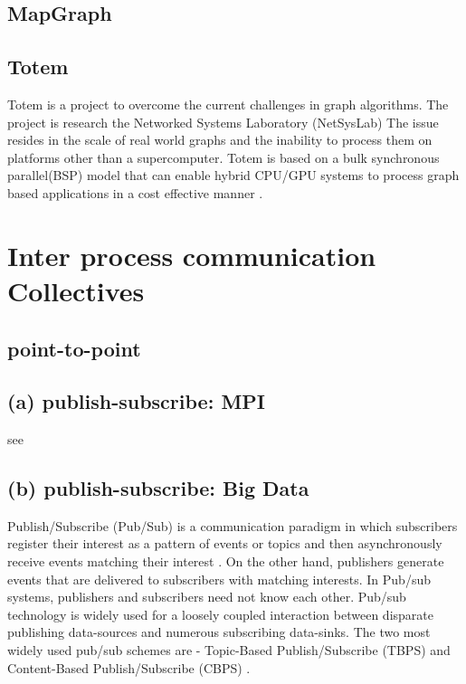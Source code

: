      \pv

\subsection{MapGraph}

\pv 

\subsection{Totem}

     Totem is a project to overcome the current challenges in graph 
     algorithms.  The project is research the Networked Systems
     Laboratory (NetSysLab) The issue resides in the scale of real 
     world graphs and the inability to process them on platforms
     other than a supercomputer.  Totem is based on a bulk synchronous 
     parallel(BSP) model that can enable hybrid CPU/GPU systems to process 
     graph based applications in a cost effective manner
     \cite{www-netsyslab}.

     \pv


\section{Inter process communication Collectives}
\label{S:o-process-communication}


\subsection{point-to-point}
\subsection{(a) publish-subscribe: MPI \cv}

     see 
     
\subsection{(b) publish-subscribe: Big Data}

     Publish/Subscribe (Pub/Sub) is a
     communication paradigm in which subscribers register their
     interest as a pattern of events or topics and then asynchronously
     receive events matching their interest \cite{thesis-pub-sub}.
     On the other hand,
     publishers generate events that are delivered to subscribers with
     matching interests.  In Pub/sub systems, publishers and
     subscribers need not know each other. Pub/sub technology is
     widely used for a loosely coupled interaction between disparate
     publishing data-sources and numerous subscribing data-sinks. The
     two most widely used pub/sub schemes are - Topic-Based
     Publish/Subscribe (TBPS) and Content-Based Publish/Subscribe
     (CBPS) \cite{paper-pub-sub}.
      
